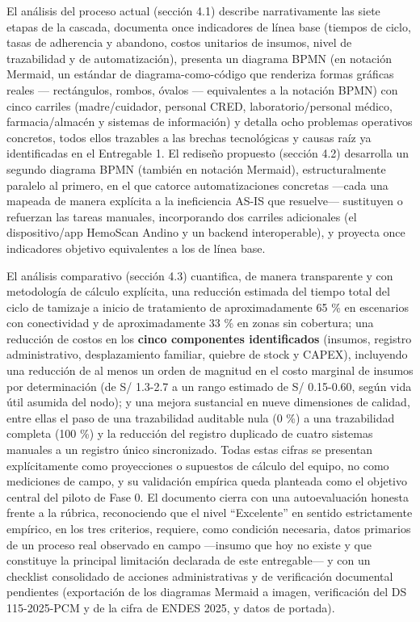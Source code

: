 \documentclass[11pt,a4paper]{article}
\begin{document}
El análisis del proceso actual (sección 4.1) describe narrativamente las siete etapas de la cascada, documenta once indicadores de línea base (tiempos de ciclo, tasas de adherencia y abandono, costos unitarios de insumos, nivel de trazabilidad y de automatización), presenta un diagrama BPMN (en notación Mermaid, un estándar de diagrama-como-código que renderiza formas gráficas reales --- rectángulos, rombos, óvalos --- equivalentes a la notación BPMN) con cinco carriles (madre/cuidador, personal CRED, laboratorio/personal médico, farmacia/almacén y sistemas de información) y detalla ocho problemas operativos concretos, todos ellos trazables a las brechas tecnológicas y causas raíz ya identificadas en el Entregable 1. El rediseño propuesto (sección 4.2) desarrolla un segundo diagrama BPMN (también en notación Mermaid), estructuralmente paralelo al primero, en el que catorce automatizaciones concretas ---cada una mapeada de manera explícita a la ineficiencia AS-IS que resuelve--- sustituyen o refuerzan las tareas manuales, incorporando dos carriles adicionales (el dispositivo/app HemoScan Andino y un backend interoperable), y proyecta once indicadores objetivo equivalentes a los de línea base.

El análisis comparativo (sección 4.3) cuantifica, de manera transparente y con metodología de cálculo explícita, una reducción estimada del tiempo total del ciclo de tamizaje a inicio de tratamiento de aproximadamente 65 \% en escenarios con conectividad y de aproximadamente 33 \% en zonas sin cobertura; una reducción de costos en los \textbf{cinco componentes identificados} (insumos, registro administrativo, desplazamiento familiar, quiebre de stock y CAPEX), incluyendo una reducción de al menos un orden de magnitud en el costo marginal de insumos por determinación (de S/ 1.3-2.7 a un rango estimado de S/ 0.15-0.60, según vida útil asumida del nodo); y una mejora sustancial en nueve dimensiones de calidad, entre ellas el paso de una trazabilidad auditable nula (0 \%) a una trazabilidad completa (100 \%) y la reducción del registro duplicado de cuatro sistemas manuales a un registro único sincronizado. Todas estas cifras se presentan explícitamente como proyecciones o supuestos de cálculo del equipo, no como mediciones de campo, y su validación empírica queda planteada como el objetivo central del piloto de Fase 0. El documento cierra con una autoevaluación honesta frente a la rúbrica, reconociendo que el nivel ``Excelente'' en sentido estrictamente empírico, en los tres criterios, requiere, como condición necesaria, datos primarios de un proceso real observado en campo ---insumo que hoy no existe y que constituye la principal limitación declarada de este entregable--- y con un checklist consolidado de acciones administrativas y de verificación documental pendientes (exportación de los diagramas Mermaid a imagen, verificación del DS 115-2025-PCM y de la cifra de ENDES 2025, y datos de portada).
\end{document}
